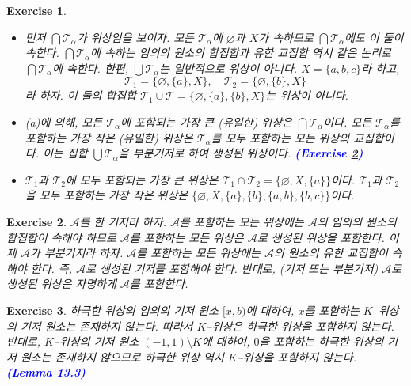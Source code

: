 \documentclass{article}
\newtheorem{exercise}{Exercise}[section]
\begin{document}
\begin{exercise}
	\label{exc:13.4}
    \phantom{}
    \begin{itemize}
        \item[(a)] 먼저 $\bigcap\mathcal{T}_\alpha$가 위상임을 보이자. 모든 $\mathcal{T}_\alpha$에 $\varnothing$과 $X$가 속하므로 $\bigcap\mathcal{T}_\alpha$에도 이 둘이 속한다. $\bigcap\mathcal{T}_\alpha$에 속하는 임의의 원소의 합집합과 유한 교집합 역시 같은 논리로 $\bigcap\mathcal{T}_\alpha$에 속한다. 한편, $\bigcup\mathcal{T}_\alpha$는 일반적으로 위상이 아니다. $X=\{a,b,c\}$라 하고,
            \begin{equation*}
                \mathcal{T}_1=\{\varnothing,\{a\},X\},\quad\mathcal{T}_2=\{\varnothing,\{b\},X\}
            \end{equation*}
            라 하자. 이 둘의 합집합 $\mathcal{T}_1\cup\mathcal{T}=\{\varnothing,\{a\},\{b\},X\}$는 위상이 아니다.
        \item[(b)] (a)에 의해, 모든 $\mathcal{T}_\alpha$에 포함되는 가장 큰 (유일한) 위상은 $\bigcap\mathcal{T}_\alpha$이다. 모든 $\mathcal{T}_\alpha$를 포함하는 가장 작은 (유일한) 위상은 $\mathcal{T}_\alpha$를 모두 포함하는 모든 위상의 교집합이다. 이는 집합 $\bigcup\mathcal{T}_\alpha$을 부분기저로 하여 생성된 위상이다. \textcolor{blue}{\textbf{(Exercise \ref{exc:13.5})}}
        \item[(c)] $\mathcal{T}_1$과 $\mathcal{T}_2$에 모두 포함되는 가장 큰 위상은 $\mathcal{T}_1\cap\mathcal{T}_2=\{\varnothing,X,\{a\}\}$이다. $\mathcal{T}_1$과 $\mathcal{T}_2$을 모두 포함하는 가장 작은 위상은 $\{\varnothing,X,\{a\},\{b\},\{a,b\},\{b,c\}\}$이다.
    \end{itemize}
\end{exercise}

\begin{exercise}
	\label{exc:13.5}
    $\mathcal{A}$를 한 기저라 하자. $\mathcal{A}$를 포함하는 모든 위상에는 $\mathcal{A}$의 임의의 원소의 합집합이 속해야 하므로 $\mathcal{A}$를 포함하는 모든 위상은 $\mathcal{A}$로 생성된 위상을 포함한다. 이제 $\mathcal{A}$가 부분기저라 하자. $\mathcal{A}$를 포함하는 모든 위상에는 $\mathcal{A}$의 원소의 유한 교집합이 속해야 한다. 즉, $\mathcal{A}$로 생성된 기저를 포함해야 한다. 반대로, (기저 또는 부분기저) $\mathcal{A}$로 생성된 위상은 자명하게 $\mathcal{A}$를 포함한다.
\end{exercise}

\begin{exercise}
    하극한 위상의 임의의 기저 원소 $[x,b)$에 대하여, $x$를 포함하는 $K$--위상의 기저 원소는 존재하지 않는다. 따라서 $K$--위상은 하극한 위상을 포함하지 않는다. 반대로, $K$--위상의 기저 원소 $(-1,1)\setminus K$에 대하여, $0$을 포함하는 하극한 위상의 기저 원소는 존재하지 않으므로 하극한 위상 역시 $K$--위상을 포함하지 않는다. \textcolor{blue}{\textbf{(Lemma 13.3)}}
\end{exercise}
\end{document}
